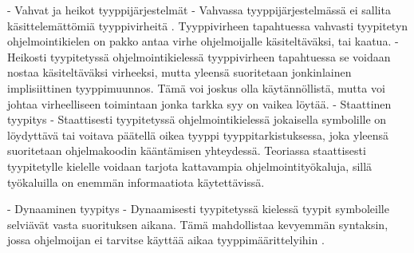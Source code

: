 \begin{otherlanguage}{finnish}
    - Vahvat ja heikot tyyppijärjestelmät
        - Vahvassa tyyppijärjestelmässä ei sallita käsittelemättömiä tyyppivirheitä \cite{cardelli_typeful_1989}. Tyyppivirheen tapahtuessa vahvasti tyypitetyn ohjelmointikielen on pakko antaa virhe ohjelmoijalle käsiteltäväksi, tai kaatua.
        - Heikosti tyypitetyssä ohjelmointikielessä tyyppivirheen tapahtuessa se voidaan nostaa käsiteltäväksi virheeksi, mutta yleensä suoritetaan jonkinlainen implisiittinen tyyppimuunnos. Tämä voi joskus olla käytännöllistä, mutta voi johtaa virheelliseen toimintaan jonka tarkka syy on vaikea löytää.
    - Staattinen tyypitys
        - Staattisesti tyypitetyssä ohjelmointikielessä jokaisella symbolille on löydyttävä tai voitava päätellä oikea tyyppi tyyppitarkistuksessa, joka yleensä suoritetaan ohjelmakoodin kääntämisen yhteydessä. Teoriassa staattisesti tyypitetylle kielelle voidaan tarjota kattavampia ohjelmointityökaluja, sillä työkaluilla on enemmän informaatiota käytettävissä.

    - Dynaaminen tyypitys
        - Dynaamisesti tyypitetyssä kielessä tyypit symboleille selviävät vasta suorituksen aikana. Tämä mahdollistaa kevyemmän syntaksin, jossa ohjelmoijan ei tarvitse käyttää aikaa tyyppimäärittelyihin \cite{di_grazia_evolution_2022}.



\end{otherlanguage}
